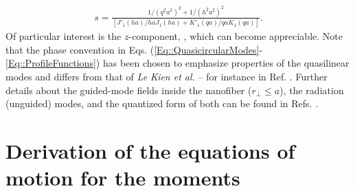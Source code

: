 \documentclass[preprint,aps,pra,onecolumn]{revtex4-1} %
\begin{document}
\begin{appendix}
	\begin{align}
		s = \frac{1/(q^2 a^2)^{2} + 1/(h^2 a^2)^{2}}{[J'_1(ha)/haJ_1(ha) + K'_1(qa)/qaK_1(qa)]}.
	\end{align}  
Of particular interest is the $z$-component, , which can become appreciable.  Note that the phase convention in Eqs. (\ref{Eq::QuasicircularModes}-\ref{Eq::ProfileFunctions}) has been chosen to emphasize properties of the quasilinear modes and differs from that of \emph{Le Kien et al.} -- for instance in Ref. \cite{le_kien_propagation_2014}.  Further details about the guided-mode fields inside the nanofiber ($r_\perp\leq a$), the radiation (unguided) modes, and the quantized form of both can be found in Refs. \cite{sondergaard_general_2001, tong_single-mode_2004, kien_field_2004, le_kien_spontaneous_2005, Vetsch thesis}.


\section{Derivation of the equations of motion for the moments} \label{Appendix::OpticalPumping}	
			

\end{appendix}
\end{document}

